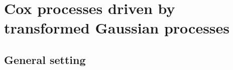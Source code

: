 \documentclass[alpha-refs]{wiley-article}
\begin{document}
%



\section{Cox processes driven by transformed Gaussian processes}\label{s:cox}



\subsection{General setting}\label{s:cox-general}

\end{document}
